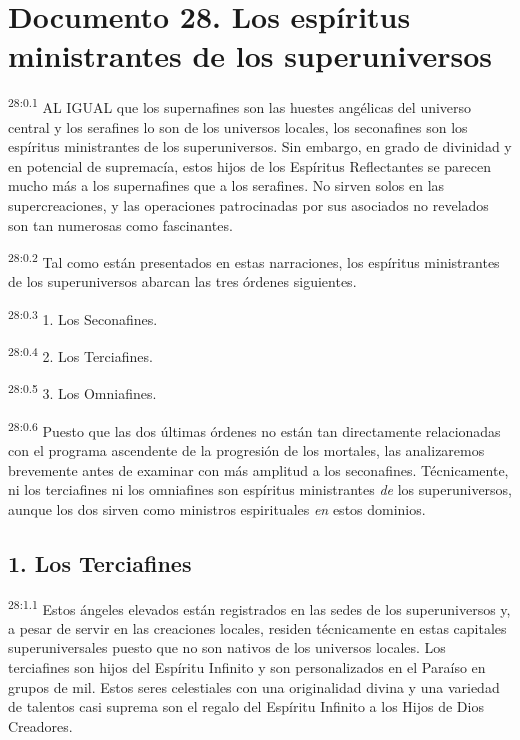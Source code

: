 \chapter{Documento 28. Los espíritus ministrantes de los superuniversos}
\par
\textsuperscript{28:0.1} AL IGUAL que los supernafines son las huestes angélicas del universo central y los serafines lo son de los universos locales, los seconafines son los espíritus ministrantes de los superuniversos. Sin embargo, en grado de divinidad y en potencial de supremacía, estos hijos de los Espíritus Reflectantes se parecen mucho más a los supernafines que a los serafines. No sirven solos en las supercreaciones, y las operaciones patrocinadas por sus asociados no revelados son tan numerosas como fascinantes.

\par
\textsuperscript{28:0.2} Tal como están presentados en estas narraciones, los espíritus ministrantes de los superuniversos abarcan las tres órdenes siguientes.

\par
\textsuperscript{28:0.3} 1. Los Seconafines.

\par
\textsuperscript{28:0.4} 2. Los Terciafines.

\par
\textsuperscript{28:0.5} 3. Los Omniafines.

\par
\textsuperscript{28:0.6} Puesto que las dos últimas órdenes no están tan directamente relacionadas con el programa ascendente de la progresión de los mortales, las analizaremos brevemente antes de examinar con más amplitud a los seconafines. Técnicamente, ni los terciafines ni los omniafines son espíritus ministrantes \textit{de} los superuniversos, aunque los dos sirven como ministros espirituales \textit{en} estos dominios.

\section*{1. Los Terciafines}
\par
\textsuperscript{28:1.1} Estos ángeles elevados están registrados en las sedes de los superuniversos y, a pesar de servir en las creaciones locales, residen técnicamente en estas capitales superuniversales puesto que no son nativos de los universos locales. Los terciafines son hijos del Espíritu Infinito y son personalizados en el Paraíso en grupos de mil. Estos seres celestiales con una originalidad divina y una variedad de talentos casi suprema son el regalo del Espíritu Infinito a los Hijos de Dios Creadores.

